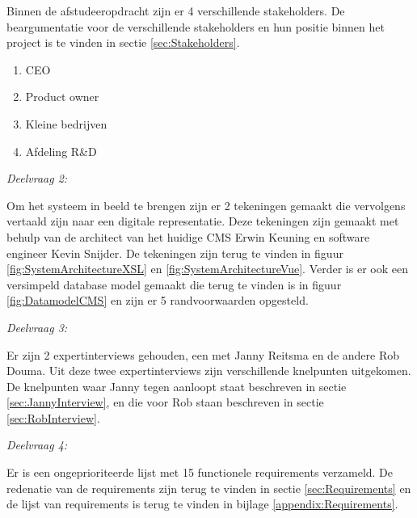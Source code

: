 \whitespace
Binnen de afstudeeropdracht zijn er 4 verschillende stakeholders.
De beargumentatie voor de verschillende stakeholders en hun positie binnen het project is te vinden in sectie \ref{sec:Stakeholders}.
\begin{enumerate}
    \item{CEO}
    \item{Product owner}
    \item{Kleine bedrijven}
    \item{Afdeling R\&D}
\end{enumerate}

\begin{center}
	\textit{Deelvraag 2: \SubquestionTwo}
\end{center}

\whitespace
Om het systeem in beeld te brengen zijn er 2 tekeningen gemaakt die vervolgens vertaald zijn naar een digitale representatie.
Deze tekeningen zijn gemaakt met behulp van de architect van het huidige CMS Erwin Keuning en software engineer Kevin Snijder.
De tekeningen zijn terug te vinden in figuur \ref{fig:SystemArchitectureXSL} en \ref{fig:SystemArchitectureVue}.
Verder is er ook een versimpeld database model gemaakt die terug te vinden is in figuur \ref{fig:DatamodelCMS} en zijn er 5 randvoorwaarden opgesteld.

\begin{center}
	\textit{Deelvraag 3: \SubquestionThree}
\end{center}

\whitespace
Er zijn 2 expertinterviews gehouden, een met Janny Reitsma en de andere Rob Douma.
Uit deze twee expertinterviews zijn verschillende knelpunten uitgekomen.
De knelpunten waar Janny tegen aanloopt staat beschreven in sectie \ref{sec:JannyInterview}, en die voor Rob staan beschreven in sectie \ref{sec:RobInterview}.

\begin{center}
	\textit{Deelvraag 4: \SubquestionFour}
\end{center}

\whitespace
Er is een ongeprioriteerde lijst met 15 functionele requirements verzameld.
De redenatie van de requirements zijn terug te vinden in sectie \ref{sec:Requirements} en de lijst van requirements is terug te vinden in bijlage \ref{appendix:Requirements}.

